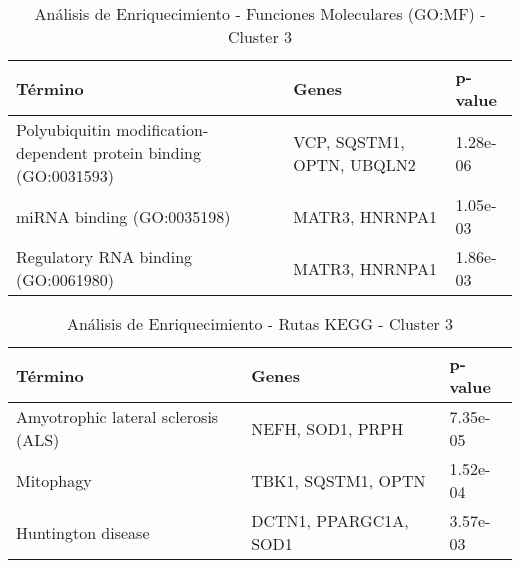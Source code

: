 \begin{table}[H]
	\centering
	\caption{Análisis de Enriquecimiento - Funciones Moleculares (GO:MF) - Cluster 3}
	\label{tb:c2_t3}
	\begin{tabular}{|p{4cm}|p{4cm}|p{3cm}|}
		\hline
		\textbf{Término} & \textbf{Genes} & \textbf{p-value} \\ \hline
		Polyubiquitin modification-dependent protein binding (GO:0031593) & VCP, SQSTM1, OPTN, UBQLN2 & 1.28e-06 \\ \hline
		miRNA binding (GO:0035198) & MATR3, HNRNPA1 & 1.05e-03 \\ \hline
		Regulatory RNA binding (GO:0061980) & MATR3, HNRNPA1 & 1.86e-03 \\ \hline
	\end{tabular}
\end{table}

\begin{table}[H]
	\centering
	\caption{Análisis de Enriquecimiento - Rutas KEGG - Cluster 3}
	\label{tb:c2_t4}
	\begin{tabular}{|p{4cm}|p{4cm}|p{3cm}|}
		\hline
		\textbf{Término} & \textbf{Genes} & \textbf{p-value} \\ \hline
		Amyotrophic lateral sclerosis (ALS) & NEFH, SOD1, PRPH & 7.35e-05 \\ \hline
		Mitophagy & TBK1, SQSTM1, OPTN & 1.52e-04 \\ \hline
		Huntington disease & DCTN1, PPARGC1A, SOD1 & 3.57e-03 \\ \hline
	\end{tabular}
\end{table}






